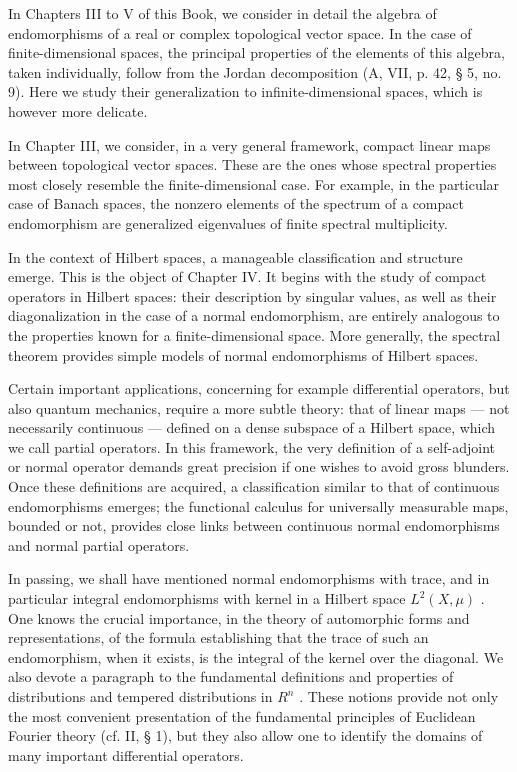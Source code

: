 
In Chapters III to V of this Book, we consider in detail the algebra of endomorphisms of a real or complex topological vector space. In the case of finite-dimensional spaces, the principal properties of the elements of this algebra, taken individually, follow from the Jordan decomposition (A, VII, p. 42, § 5, no. 9). Here we study their generalization to infinite-dimensional spaces, which is however more delicate.

In Chapter III, we consider, in a very general framework, compact linear maps between topological vector spaces. These are the ones whose spectral properties most closely resemble the finite-dimensional case. For example, in the particular case of Banach spaces, the nonzero elements of the spectrum of a compact endomorphism are generalized eigenvalues of finite spectral multiplicity.

In the context of Hilbert spaces, a manageable classification and structure emerge. This is the object of Chapter IV. It begins with the study of compact operators in Hilbert spaces: their description by singular values, as well as their diagonalization in the case of a normal endomorphism, are entirely analogous to the properties known for a finite-dimensional space. More generally, the spectral theorem provides simple models of normal endomorphisms of Hilbert spaces.

Certain important applications, concerning for example differential operators, but also quantum mechanics, require a more subtle theory: that of linear maps --- not necessarily continuous --- defined on a dense subspace of a Hilbert space, which we call partial operators. In this framework, the very definition of a self-adjoint or normal operator demands great precision if one wishes to avoid gross blunders. Once these definitions are acquired, a classification similar to that of continuous endomorphisms emerges; the functional calculus for universally measurable maps, bounded or not, provides close links between continuous normal endomorphisms and normal partial operators.

In passing, we shall have mentioned normal endomorphisms with trace, and in particular integral endomorphisms with kernel in a Hilbert space \(L^{2}(X,\mu)\) . One knows the crucial importance, in the theory of automorphic forms and representations, of the formula establishing that the trace of such an endomorphism, when it exists, is the integral of the kernel over the diagonal. We also devote a paragraph to the fundamental definitions and properties of distributions and tempered distributions in \(R^{n}\) . These notions provide not only the most convenient presentation of the fundamental principles of Euclidean Fourier theory (cf. II, § 1), but they also allow one to identify the domains of many important differential operators.

